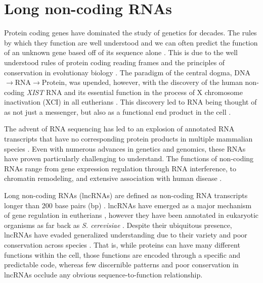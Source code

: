 \section{Long non-coding RNAs}
Protein coding genes have dominated the study of genetics for decades. The rules by which they function are well understood and we can often predict the function of an unknown gene based off of its sequence alone \cite{Whisstock2003PredictionStructure}. This is due to the well understood rules of protein coding reading frames and the principles of conservation in evolutionay biology \cite{Burge1997PredictionDNA,Altschul1990BasicTool,Wheeler2013Nhmmer:HMMs}. The paradigm of the central dogma, DNA $\rightarrow$RNA$\rightarrow$Protein, was upended, however, with the discovery of the human non-coding \emph{XIST} RNA  and its essential function in the process of X chromosome inactivation (XCI) in all eutherians \cite{Brown10TheNucleus.,Brockdorff10TheNucleus.}. This discovery led to RNA being thought of as not just a messenger, but also as a functional end product in the cell \cite{Rinn2012GenomeRNAs,Lee2003TheProcessing,Yang2013MALAT-1Regulation,Tripathi2010ThePhosphorylation,Raphael2017IntegratedAdenocarcinoma,Brown10TheNucleus.,Brockdorff10TheNucleus.}. 

The advent of RNA sequencing has led to an explosion of annotated RNA transcripts that have no corresponding protein products in multiple mammalian species \cite{Derrien2012TheExpression,Hon2017AnEnds,Bogu2016ChromatinMouse}. Even with numerous advances in genetics and genomics, these RNAs have proven particularly challenging to understand. The functions of non-coding RNAs range from gene expression regulation through RNA interference, to chromatin remodeling, and extensive association with human disease \cite{Rinn2012GenomeRNAs,Lee2003TheProcessing,Yang2013MALAT-1Regulation,Tripathi2010ThePhosphorylation,Raphael2017IntegratedAdenocarcinoma,}.

Long non-coding RNAs (lncRNAs) are defined as non-coding RNA transcripts longer than 200 base pairs (bp) \cite{Derrien2012TheExpression}. lncRNAs have emerged as a major mechanism of gene regulation in eutherians \cite{Sarropoulos2019DevelopmentalSpecies,Bogu2016ChromatinMouse,Sauvageau2013MultipleDevelopment}, however they have been annotated in eukaryotic organisms as far back as \emph{S. cerevisiae} \cite{Niederer2017LongCerevisiae}. Despite their ubiquitous presence, lncRNAs have evaded generalized understanding due to their variety and poor conservation across species \cite{Johnsson2014EvolutionaryFunction}. That is, while proteins can have many different functions within the cell, those functions are encoded through a specific and predictable code, whereas few discernible patterns and poor conservation in lncRNAs occlude any obvious sequence-to-function relationship.



